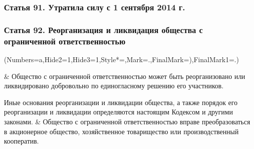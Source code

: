 \documentclass{report}
\newcommand{\beginEasyList}{
        \begin{easylist}[enumerate]
            \ListProperties(Numbers=a,Hide2=1,Hide3=1,Style*=,Mark=.,FinalMark={)},FinalMark1=.)
    }
\newcommand{\eEasyList}{\end{easylist}}
\begin{document}
\subsubsection{{\bf Статья 91.} Утратила силу с 1 сентября 2014 г.}
\subsubsection{{\bf Статья 92.} Реорганизация и ликвидация общества с ограниченной ответственностью}
\beginEasyList
& Общество с ограниченной ответственностью может быть реорганизовано или ликвидировано добровольно по единогласному решению его участников.
\par Иные основания реорганизации и ликвидации общества, а также порядок его реорганизации и ликвидации определяются настоящим Кодексом и другими законами.
& Общество с ограниченной ответственностью вправе преобразоваться в акционерное общество, хозяйственное товарищество или производственный кооператив.
\eEasyList
\end{document}
